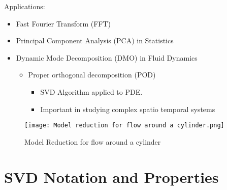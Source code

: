 \documentclass[9pt]{beamer}
\begin{document}
\begin{frame}{Applications:}
    \begin{itemize}
        \item Fast Fourier Transform (FFT)
        \item Principal Component Analysis (PCA) in Statistics
        \item Dynamic Mode Decomposition (DMO) in Fluid Dynamics
        \begin{itemize}
            \item Proper orthogonal decomposition (POD)
            \begin{itemize}
                \item SVD Algorithm applied to PDE. 
                \item Important in studying complex spatio temporal systems
            \end{itemize}
        \end{itemize}
    \end{itemize}
    
    \begin{figure}
            \texttt{[image: Model reduction for flow around a cylinder.png]}
            \caption{Model Reduction for flow around a cylinder}
    \end{figure}
    
\end{frame}

\section{SVD Notation and Properties}
\end{document}
